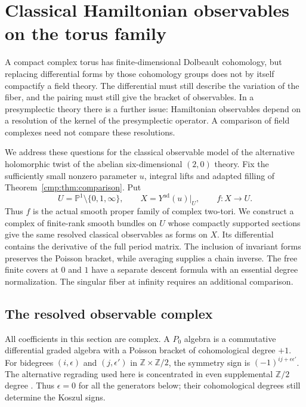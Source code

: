 \section{Classical Hamiltonian observables on the torus family}
\label{hp:sec}

A compact complex torus has finite-dimensional Dolbeault cohomology,
but replacing differential forms by those cohomology groups does not by itself
compactify a field theory. The differential must still describe the
variation of the fiber, and the pairing must still give the bracket
of observables. In a presymplectic theory there is a further issue:
Hamiltonian observables depend on a resolution of the kernel of the
presymplectic operator. A comparison of field complexes need not
compare these resolutions.

We address these questions for the classical observable model of the
alternative holomorphic twist of the abelian six-dimensional
$(2,0)$ theory. Fix the sufficiently small nonzero parameter $u$,
integral lifts and adapted filling of
Theorem~\ref{cmp:thm:comparison}. Put
\[
 U=\mathbb P^1\setminus\{0,1,\infty\},\qquad
 X=Y^{\mathrm{ad}}(u)|_U,\qquad f:X\longrightarrow U.
\]
Thus $f$ is the actual smooth proper family of complex two-tori.
We construct a complex of finite-rank smooth bundles on $U$ whose
compactly supported sections give the same resolved classical
observables as forms on $X$. Its differential contains the derivative
of the full period matrix. The inclusion of invariant forms preserves
the Poisson bracket, while averaging supplies a chain inverse.
The free finite covers at $0$ and $1$ have a separate descent formula
with an essential degree normalization. The singular fiber at infinity
requires an additional comparison.

\subsection{The resolved observable complex}
\label{hp:subsec:observables}

All coefficients in this section are complex. A $P_0$ algebra is a
commutative differential graded algebra with a Poisson bracket of
cohomological degree $+1$. For bidegrees $(i,\epsilon)$ and
$(j,\epsilon')$ in $\mathbb Z\times\mathbb Z/2$, the symmetry sign is
$(-1)^{ij+\epsilon\epsilon'}$. The alternative regrading used here is
concentrated in even supplemental $\mathbb Z/2$ degree
\cite[\S4.5.1]{SaberiWilliamsConstraints}. Thus $\epsilon=0$ for all
the generators below; their cohomological degrees still determine the
Koszul signs.

